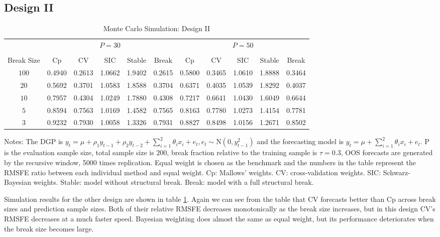 \subsection{Design II}
\begin{table}
    \caption{Monte Carlo Simulation: Design II} \label{ntb:2}
    \centering
    \begin{adjustbox}{width=\textwidth,totalheight=\textheight,keepaspectratio}
    \begin{threeparttable}
    \begin{tabular}{ccccccccccc}
    \toprule
     & \multicolumn{5}{c}{$P = 30$} & \multicolumn{5}{c}{$P = 50$} \\
    \cmidrule(r){2-6}
    \cmidrule(r){7-11} \\
    Break Size      & Cp     & CV     & SIC    & Stable & Break  & Cp     & CV     & SIC    & Stable & Break  \\
    $100$           & 0.4940 & 0.2613 & 1.0662 & 1.9402 & 0.2615 & 0.5800 & 0.3465 & 1.0610 & 1.8888 & 0.3464 \\
    $20$            & 0.5692 & 0.3701 & 1.0583 & 1.8588 & 0.3704 & 0.6371 & 0.4035 & 1.0539 & 1.8292 & 0.4037 \\
    $10$            & 0.7957 & 0.4304 & 1.0249 & 1.7880 & 0.4308 & 0.7217 & 0.6641 & 1.0430 & 1.6049 & 0.6644 \\
    $5$             & 0.8594 & 0.7563 & 1.0169 & 1.4582 & 0.7565 & 0.8163 & 0.7780 & 1.0273 & 1.4154 & 0.7781 \\
    $3$             & 0.9232 & 0.7930 & 1.0058 & 1.3326 & 0.7931 & 0.8827 & 0.8498 & 1.0156 & 1.2671 & 0.8502 \\
    \bottomrule
    \end{tabular}
    \begin{tablenotes} \footnotesize
    Notes: The DGP is $y_{t} = \mu + \rho_{1}y_{t-1} + \rho_{2}y_{t-2} + \sum_{i=1}^{2}\theta_{i}x_{i} + e_{t}, e_{t} \sim \mathrm{N}(0, y_{t-1}^{2})$ and the forecasting model is $y_{t} = \mu + \sum_{i=1}^{2}\theta_{i}x_{i} + e_{t}$. $\mathrm{P}$ is the evaluation sample size, total sample size is $200$, break fraction relative to the training sample is $\tau = 0.3$, OOS forecasts are generated by the recursive window, 5000 times replication. Equal weight is chosen as the benchmark and the numbers in the table represent the RMSFE ratio between each individual method and equal weight. Cp: Mallows' weights. CV: cross-validation weights. SIC: Schwarz-Bayesian weights. Stable: model without structural break. Break: model with a full structural break.
    \end{tablenotes}
    \end{threeparttable}
    \end{adjustbox}
\end{table}
Simulation results for the other design are shown in table \ref{ntb:2}. Again we can see from the table that CV forecasts better than Cp across break sizes and prediction sample sizes. Both of their relative RMSFE decreases monotonically as the break size increases, but in this design CV's RMSFE decreases at a much faster speed. Bayesian weighting does almost the same as equal weight, but its performance deteriorates when the break size becomes large.

